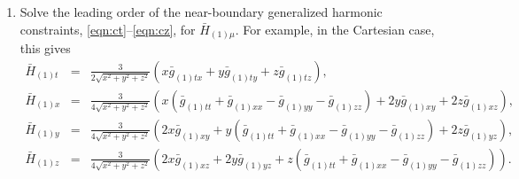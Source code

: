 \documentclass[a4paper,11pt]{article}
\numberwithin{equation}{section}
\begin{document}
\begin{enumerate}
\item Solve the leading order of the near-boundary generalized harmonic constraints, \eqref{eqn:ct}--\eqref{eqn:cz}, for $\bar{H}_{(1)\mu}$. For example, in the Cartesian case, this gives
\begin{eqnarray}\label{eqn:target_gauge_txyz_step1}
\bar{H}_{(1)t}&=&\frac{3}{2\sqrt{x^2+y^2+z^2}}(x \bar{g}_{(1)tx}+y\bar{g}_{(1)ty}+z\bar{g}_{(1)tz}), \\
\bar{H}_{(1)x}&=&\frac{3}{4\sqrt{x^2+y^2+z^2}}(x(\bar{g}_{(1)tt}+ \bar{g}_{(1)xx}-\bar{g}_{(1)yy}-\bar{g}_{(1)zz})+2y \bar{g}_{(1)xy}+2z \bar{g}_{(1)xz}), \nonumber \\
\bar{H}_{(1)y}&=&\frac{3}{4\sqrt{x^2+y^2+z^2}}(2x \bar{g}_{(1)xy}+y(\bar{g}_{(1)tt}+ \bar{g}_{(1)xx}-\bar{g}_{(1)yy}-\bar{g}_{(1)zz})+2z \bar{g}_{(1)yz}), \nonumber \\
\bar{H}_{(1)z}&=&\frac{3}{4\sqrt{x^2+y^2+z^2}}(2x \bar{g}_{(1)xz}+2y \bar{g}_{(1)yz}+z(\bar{g}_{(1)tt}+ \bar{g}_{(1)xx}-\bar{g}_{(1)yy}-\bar{g}_{(1)zz})). \nonumber 
\end{eqnarray}



\end{enumerate}
\end{document}
